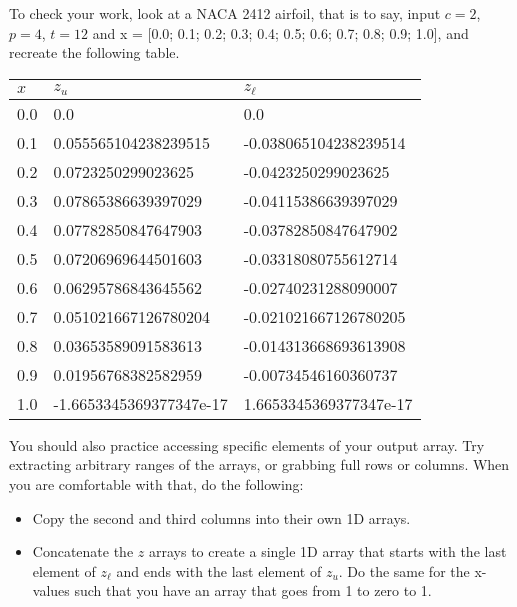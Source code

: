 \documentclass{article}%
\begin{document}
To check your work, look at a NACA 2412 airfoil, that is to say, input $c=2$, $p=4$, $t=12$ and x = [0.0; 0.1; 0.2; 0.3; 0.4; 0.5; 0.6; 0.7; 0.8; 0.9; 1.0], and recreate the following table.

\bigskip

\renewcommand{\arraystretch}{1.2}
\begin{tabular}{ l | l | l}
$x$ & $z_u$ & $z_\ell$\\
\hline
0.0 & 0.0 & 0.0 \\
0.1 & 0.055565104238239515 & -0.038065104238239514 \\
0.2 & 0.0723250299023625 & -0.0423250299023625 \\
0.3 & 0.07865386639397029 & -0.04115386639397029 \\
0.4 & 0.07782850847647903 & -0.03782850847647902 \\
0.5 & 0.07206969644501603 & -0.03318080755612714 \\
0.6 & 0.06295786843645562 & -0.02740231288090007 \\
0.7 & 0.051021667126780204 & -0.021021667126780205 \\
0.8 & 0.03653589091583613 & -0.014313668693613908 \\
0.9 & 0.01956768382582959 & -0.00734546160360737 \\
1.0 & -1.6653345369377347e-17 & 1.6653345369377347e-17 \\
\hline
\end{tabular}

\bigskip

You should also practice accessing specific elements of your output array. Try extracting arbitrary ranges of the arrays, or grabbing full rows or columns.  When you are comfortable with that, do the following:
\begin{itemize}
	\item Copy the second and third columns into their own 1D arrays.
	\item Concatenate the $z$ arrays to create a single 1D array that starts with the last element of $z_\ell$ and ends with the last element of $z_u$. Do the same for the x-values such that you have an array that goes from 1 to zero to 1.
\end{itemize}
\end{document}
